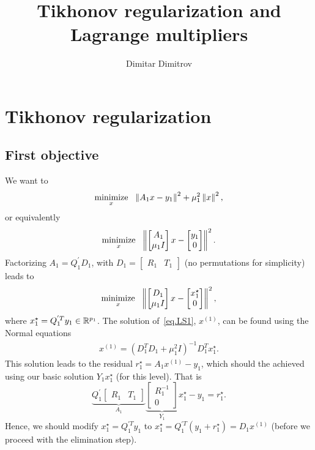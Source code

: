 \documentclass[12pt]{article}
\title{Tikhonov regularization and Lagrange multipliers} \author{Dimitar Dimitrov}
\begin{document}
\maketitle

\section{Tikhonov regularization}

\subsection{First objective}

We want to
%
\begin{align*}
\mathop{\mbox{minimize}}_{x} \ \  \left\lVert A_1x - y_1\right\rVert^2 + \mu_1^2\left\lVert x\right\rVert^2,
\end{align*}
%
or equivalently
%
\begin{align*}
\mathop{\mbox{minimize}}_{x} \ \  \left\lVert\begin{bmatrix} A_1 \\ \mu_1I \end{bmatrix}x - \begin{bmatrix} y_1 \\ 0 \end{bmatrix}\right\rVert^2.
\end{align*}
%
Factorizing $A_1 = Q_1^{'}D_1$, with $D_1 = \begin{bmatrix} R_1 & T_1\end{bmatrix}$ (no permutations
  for simplicity) leads to
%
\begin{align} \label{eq.LS1}
  \mathop{\mbox{minimize}}_{x} \ \  \left\lVert\begin{bmatrix} D_1 \\ \mu_1I \end{bmatrix}x -
    \begin{bmatrix} x_1^{\star} \\ 0 \end{bmatrix}\right\rVert^2,
\end{align}
%
where $x_1^{\star} = Q_1^{'T}y_1 \in {\mathbb{R}}^{p_1}$. The solution of~\eqref{eq.LS1}, $x^{(1)}$, can
be found using the Normal equations
%
\begin{align*}
  x^{(1)} = (D_1^TD_1 + \mu_1^2I)^{-1}D_1^Tx_1^{\star}.
\end{align*}
%
This solution leads to the residual $r_1^{\star} = A_1x^{(1)} - y_1$, which should the achieved
using our basic solution $Y_1x_1^{\star}$ (for this level). That is
%
\[
\underbrace{Q_1^{'}\begin{bmatrix} R_1 & T_1\end{bmatrix}}_{A_1}
  \underbrace{\begin{bmatrix} R_1^{-1} \\ 0\end{bmatrix}}_{Y_1}x_1^{\star} - y_1 = r_1^{\star}.
\]
%
Hence, we should modify $x_1^{\star} = Q_1^{'T}y_1$ to $ x_1^{\star} = Q_1^{'T}(y_1 + r_1^{\star}) =
D_1x^{(1)}$ (before we proceed with the elimination step).
%
\end{document}
